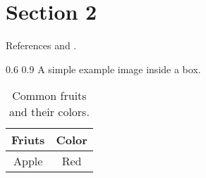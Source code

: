 
\section{Section 2}
References \parencite{Ref01}  and \parencite{Ref02}.

\begin{centerBoxImageStyle}
    {}     
    {0.6\linewidth}                         
    {0.9\linewidth}                         
    {A simple example image inside a box.}  
    {}               
\end{centerBoxImageStyle}

\begin{center}
    \begin{table}[h!] %
        \begin{tabular}{|c|c|}     \hline
            Friuts & Color          \\ \hline
            Apple & Red             \\ \hline
        \end{tabular}
        \caption{Common fruits and their colors.}
    \end{table}
\end{center}

